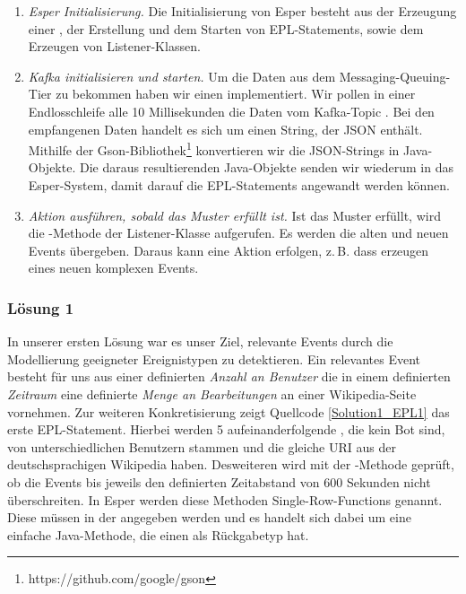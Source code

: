 \begin{enumerate}
    \item \textit{Esper Initialisierung.} Die Initialisierung von Esper besteht aus der Erzeugung einer ,
    der Erstellung und dem Starten von EPL-Statements, sowie dem Erzeugen von Listener-Klassen.
    \item \textit{Kafka initialisieren und starten.} Um die Daten aus dem Messaging-Queuing-Tier zu bekommen haben wir einen
     implementiert.
    Wir pollen in einer Endlosschleife alle 10 Millisekunden die Daten vom Kafka-Topic . Bei den empfangenen Daten
    handelt es sich um einen String, der JSON enthält. Mithilfe der Gson-Bibliothek\footnote{https://github.com/google/gson}
    konvertieren wir die JSON-Strings in Java-Objekte. Die daraus resultierenden Java-Objekte senden wir wiederum in das
    Esper-System, damit darauf die EPL-Statements angewandt werden können.
    \item \textit{Aktion ausführen, sobald das Muster erfüllt ist.} Ist das Muster erfüllt, wird die -Methode der Listener-Klasse
    aufgerufen. Es werden die alten und neuen Events übergeben. Daraus kann eine Aktion erfolgen, z.\,B. dass erzeugen eines neuen
    komplexen Events.
\end{enumerate}


\subsubsection{Lösung 1}
In unserer ersten Lösung war es unser Ziel, relevante Events durch die Modellierung geeigneter Ereignistypen zu detektieren.
Ein relevantes Event besteht für uns aus einer definierten \textit{Anzahl an Benutzer} die in einem
definierten \textit{Zeitraum} eine definierte \textit{Menge an Bearbeitungen} an einer Wikipedia-Seite vornehmen.
Zur weiteren Konkretisierung zeigt Quellcode \ref{Solution1_EPL1} das erste EPL-Statement. Hierbei werden
5 aufeinanderfolgende , die kein Bot sind, von unterschiedlichen Benutzern stammen
und die gleiche URI aus der deutschsprachigen Wikipedia haben. Desweiteren wird mit der -Methode
geprüft, ob die Events  bis  jeweils den definierten Zeitabstand von 600 Sekunden nicht überschreiten.
In Esper werden diese Methoden Single-Row-Functions genannt. Diese müssen in der  angegeben werden
und es handelt sich dabei um eine einfache Java-Methode, die einen  als Rückgabetyp hat.

